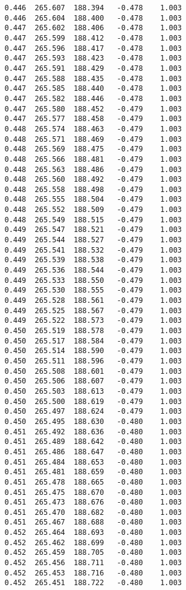 \begin{verbatim}
   0.446  265.607  188.394   -0.478    1.003
   0.446  265.604  188.400   -0.478    1.003
   0.447  265.602  188.406   -0.478    1.003
   0.447  265.599  188.412   -0.478    1.003
   0.447  265.596  188.417   -0.478    1.003
   0.447  265.593  188.423   -0.478    1.003
   0.447  265.591  188.429   -0.478    1.003
   0.447  265.588  188.435   -0.478    1.003
   0.447  265.585  188.440   -0.478    1.003
   0.447  265.582  188.446   -0.478    1.003
   0.447  265.580  188.452   -0.479    1.003
   0.447  265.577  188.458   -0.479    1.003
   0.448  265.574  188.463   -0.479    1.003
   0.448  265.571  188.469   -0.479    1.003
   0.448  265.569  188.475   -0.479    1.003
   0.448  265.566  188.481   -0.479    1.003
   0.448  265.563  188.486   -0.479    1.003
   0.448  265.560  188.492   -0.479    1.003
   0.448  265.558  188.498   -0.479    1.003
   0.448  265.555  188.504   -0.479    1.003
   0.448  265.552  188.509   -0.479    1.003
   0.448  265.549  188.515   -0.479    1.003
   0.449  265.547  188.521   -0.479    1.003
   0.449  265.544  188.527   -0.479    1.003
   0.449  265.541  188.532   -0.479    1.003
   0.449  265.539  188.538   -0.479    1.003
   0.449  265.536  188.544   -0.479    1.003
   0.449  265.533  188.550   -0.479    1.003
   0.449  265.530  188.555   -0.479    1.003
   0.449  265.528  188.561   -0.479    1.003
   0.449  265.525  188.567   -0.479    1.003
   0.449  265.522  188.573   -0.479    1.003
   0.450  265.519  188.578   -0.479    1.003
   0.450  265.517  188.584   -0.479    1.003
   0.450  265.514  188.590   -0.479    1.003
   0.450  265.511  188.596   -0.479    1.003
   0.450  265.508  188.601   -0.479    1.003
   0.450  265.506  188.607   -0.479    1.003
   0.450  265.503  188.613   -0.479    1.003
   0.450  265.500  188.619   -0.479    1.003
   0.450  265.497  188.624   -0.479    1.003
   0.450  265.495  188.630   -0.480    1.003
   0.451  265.492  188.636   -0.480    1.003
   0.451  265.489  188.642   -0.480    1.003
   0.451  265.486  188.647   -0.480    1.003
   0.451  265.484  188.653   -0.480    1.003
   0.451  265.481  188.659   -0.480    1.003
   0.451  265.478  188.665   -0.480    1.003
   0.451  265.475  188.670   -0.480    1.003
   0.451  265.473  188.676   -0.480    1.003
   0.451  265.470  188.682   -0.480    1.003
   0.451  265.467  188.688   -0.480    1.003
   0.452  265.464  188.693   -0.480    1.003
   0.452  265.462  188.699   -0.480    1.003
   0.452  265.459  188.705   -0.480    1.003
   0.452  265.456  188.711   -0.480    1.003
   0.452  265.453  188.716   -0.480    1.003
   0.452  265.451  188.722   -0.480    1.003

\end{verbatim}
